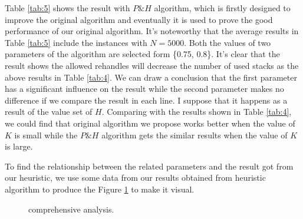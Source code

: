 \documentclass[review,3p,times,authoryear,12pt]{elsarticle}
\begin{document}
Table \ref{tab:5} shows the result with $P\&H$ algorithm, which is firstly designed to improve the original algorithm and eventually it is used to prove the good performance of our original algorithm.
It's noteworthy that the average results in Table \ref{tab:5} include the instances with $N=5000$.
Both the values of two parameters of the algorithm are selected form \{0.75, 0.8\}.
It's clear that the result shows the allowed rehandles will decrease the number of used stacks as the above results in Table \ref{tab:4}.
We can draw a conclusion that the first parameter has a significant influence on the result while the second parameter makes no difference if we compare the result in each line.
I suppose that it happens as a result of the value set of $H$.
Comparing with the results shown in Table \ref{tab:4}, we could find that original algorithm we propose works better when the value of $K$ is small while the $P\&H$ algorithm gets the similar results when the value of $K$ is large.

To find the relationship between the related parameters and the result got from our heuristic, we use some data from our results obtained from heuristic algorithm to produce the Figure \ref{fig 5:graph} to make it visual.

\begin{figure}[htbp]
\centering
\setlength{\abovecaptionskip}{10pt}
\caption{comprehensive analysis.}
\label{fig 5:graph}
\end{figure}

\end{document}
